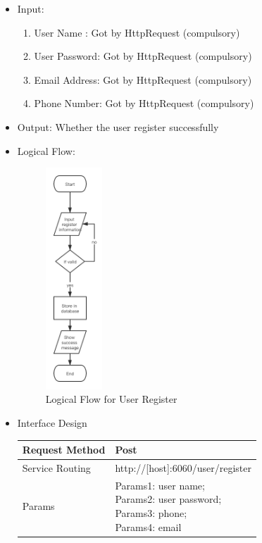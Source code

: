 \documentclass[16pt]{scrreprt}
\begin{document}
\begin{itemize}
    \item Input: \\
    \begin{enumerate}
        \item User Name : Got by HttpRequest (compulsory)
        \item User Password: Got by HttpRequest (compulsory)
        \item Email Address: Got by HttpRequest (compulsory)
        \item Phone Number: Got by HttpRequest (compulsory)
    \end{enumerate}
    \item Output: Whether the user register successfully
    \item Logical Flow:
     \begin{figure}[H]
    \centering
    \includegraphics[width=0.2\textwidth]{diagrams/register.png}
    \caption{Logical Flow for User Register}
\end{figure}
    \item Interface Design
    \begin{center}
    \begin{tabular}{p{5cm}p{10cm}}
        \hline
        Request Method & Post\\
        \hline
        Service Routing &  http://[host]:6060/user/register\\
        \hline
        Params & \makecell[l]{Params1: user name;\\ Params2: user password;\\ Params3: phone;\\Params4: email}\\ 

\end{tabular}
\end{center}
\end{itemize}
\end{document}
